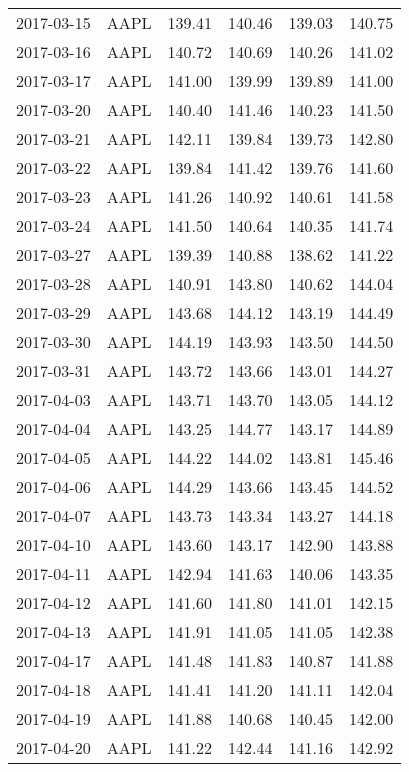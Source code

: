 \documentclass[12pt,a4paper]{report}
\begin{document}
\begin{appendices}
\begin{longtable}{llllll}
  2017-03-15 & AAPL & 139.41 & 140.46 & 139.03 & 140.75 \\ 
  2017-03-16 & AAPL & 140.72 & 140.69 & 140.26 & 141.02 \\ 
  2017-03-17 & AAPL & 141.00 & 139.99 & 139.89 & 141.00 \\ 
  2017-03-20 & AAPL & 140.40 & 141.46 & 140.23 & 141.50 \\ 
  2017-03-21 & AAPL & 142.11 & 139.84 & 139.73 & 142.80 \\ 
  2017-03-22 & AAPL & 139.84 & 141.42 & 139.76 & 141.60 \\ 
  2017-03-23 & AAPL & 141.26 & 140.92 & 140.61 & 141.58 \\ 
  2017-03-24 & AAPL & 141.50 & 140.64 & 140.35 & 141.74 \\ 
  2017-03-27 & AAPL & 139.39 & 140.88 & 138.62 & 141.22 \\ 
  2017-03-28 & AAPL & 140.91 & 143.80 & 140.62 & 144.04 \\ 
  2017-03-29 & AAPL & 143.68 & 144.12 & 143.19 & 144.49 \\ 
  2017-03-30 & AAPL & 144.19 & 143.93 & 143.50 & 144.50 \\ 
  2017-03-31 & AAPL & 143.72 & 143.66 & 143.01 & 144.27 \\ 
  2017-04-03 & AAPL & 143.71 & 143.70 & 143.05 & 144.12 \\ 
  2017-04-04 & AAPL & 143.25 & 144.77 & 143.17 & 144.89 \\ 
  2017-04-05 & AAPL & 144.22 & 144.02 & 143.81 & 145.46 \\ 
  2017-04-06 & AAPL & 144.29 & 143.66 & 143.45 & 144.52 \\ 
  2017-04-07 & AAPL & 143.73 & 143.34 & 143.27 & 144.18 \\ 
  2017-04-10 & AAPL & 143.60 & 143.17 & 142.90 & 143.88 \\ 
  2017-04-11 & AAPL & 142.94 & 141.63 & 140.06 & 143.35 \\ 
  2017-04-12 & AAPL & 141.60 & 141.80 & 141.01 & 142.15 \\ 
  2017-04-13 & AAPL & 141.91 & 141.05 & 141.05 & 142.38 \\ 
  2017-04-17 & AAPL & 141.48 & 141.83 & 140.87 & 141.88 \\ 
  2017-04-18 & AAPL & 141.41 & 141.20 & 141.11 & 142.04 \\ 
  2017-04-19 & AAPL & 141.88 & 140.68 & 140.45 & 142.00 \\ 
  2017-04-20 & AAPL & 141.22 & 142.44 & 141.16 & 142.92 \\ 

\end{longtable}
\end{appendices}
\end{document}
